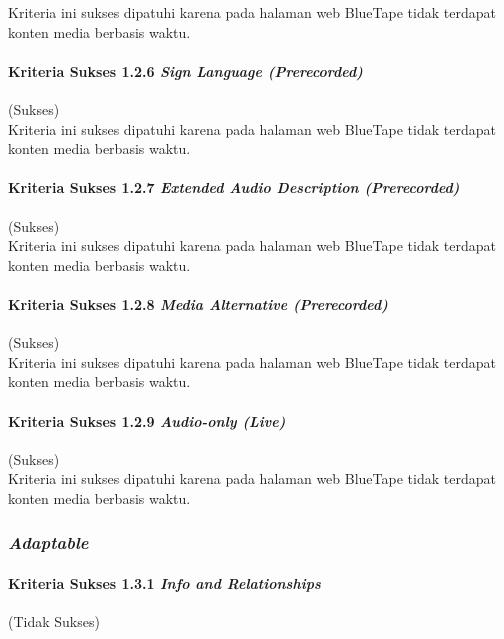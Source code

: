 Kriteria ini sukses dipatuhi karena pada halaman web BlueTape tidak terdapat konten media berbasis waktu.

\paragraph{Kriteria Sukses 1.2.6 \textit{Sign Language (Prerecorded)}}
\label{par:kepatuhan_bluetape_kriteria_sukses_1.2.6}
(Sukses)\\

Kriteria ini sukses dipatuhi karena pada halaman web BlueTape tidak terdapat konten media berbasis waktu.

\paragraph{Kriteria Sukses 1.2.7 \textit{Extended Audio Description (Prerecorded)}}
\label{par:kepatuhan_bluetape_kriteria_sukses_1.2.7}
(Sukses)\\

Kriteria ini sukses dipatuhi karena pada halaman web BlueTape tidak terdapat konten media berbasis waktu.

\paragraph{Kriteria Sukses 1.2.8 \textit{Media Alternative (Prerecorded)}}
\label{par:kepatuhan_bluetape_kriteria_sukses_1.2.8}
(Sukses)\\

Kriteria ini sukses dipatuhi karena pada halaman web BlueTape tidak terdapat konten media berbasis waktu.

\paragraph{Kriteria Sukses 1.2.9 \textit{Audio-only (Live)}}
\label{par:kepatuhan_bluetape_kriteria_sukses_1.2.9}
(Sukses)\\

Kriteria ini sukses dipatuhi karena pada halaman web BlueTape tidak terdapat konten media berbasis waktu.

\subsubsection{\textit{Adaptable}}
\label{subsubsec:kepatuhan_bluetape_adaptable}

\paragraph{Kriteria Sukses 1.3.1 \textit{Info and Relationships}}
\label{par:kepatuhan_bluetape_kriteria_sukses_1.3.1}
(Tidak Sukses)\\

